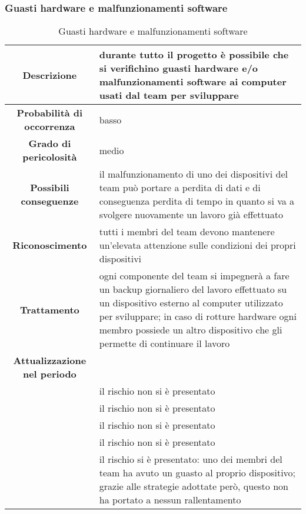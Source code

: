 \documentclass[PianoDiProgetto.tex]{subfiles}
\begin{document}
\clearpage

	\subsubsection{Guasti hardware e malfunzionamenti software}
		\label{sec:ghs}

		\begin{table}[h]
		\begin{center}
			\begin{tabular}{ | c | p{10cm} |}
				\hline
		 \textbf{Descrizione} & durante tutto il progetto è possibile che si verifichino guasti hardware e/o malfunzionamenti software ai computer usati dal team per sviluppare \\ \hline
		 \textbf{Probabilità di occorrenza} & basso \\ \hline
		 \textbf{Grado di pericolosità} & medio \\ \hline
	 \textbf{Possibili conseguenze} & il malfunzionamento di uno dei dispositivi del team può portare a perdita di dati e di conseguenza perdita di tempo in quanto si va a svolgere nuovamente un lavoro già effettuato \\ \hline
		 \textbf{Riconoscimento} & tutti i membri del team devono mantenere un'elevata attenzione sulle condizioni dei propri dispositivi \\ \hline
		 \textbf{Trattamento} & ogni componente del team si impegnerà a fare un backup giornaliero del lavoro effettuato su un dispositivo esterno al computer utilizzato per sviluppare; in caso di rotture hardware ogni membro possiede un altro dispositivo che gli permette di continuare il lavoro \\ \hline
		 \textbf{Attualizzazione nel periodo}&  \\
		 \hline
				 \textbf{\PerAR}& il rischio non si è presentato\\
				 \hline
				\textbf {\PerAD} & il rischio non si è presentato\\
				\hline
				\textbf{\PerPA} & il rischio non si è presentato \\
				\hline
				\textbf{ \PerPD} & il rischio non si è presentato\\
				\hline
				\textbf{\PerC} & il rischio si è presentato: uno dei membri del team ha avuto un guasto al proprio dispositivo; grazie alle strategie adottate però, questo non ha portato a nessun rallentamento \\
			\hline
			\end{tabular}
		\caption{Guasti hardware e malfunzionamenti software}
		\end{center}
	\end{table}
\end{document}
